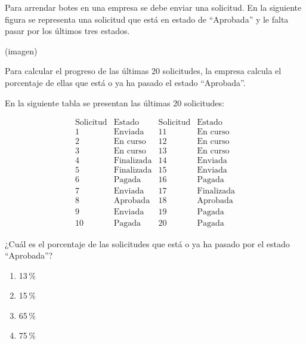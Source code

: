 \begin{problem}
    Para arrendar botes en una empresa se debe enviar una solicitud. En la siguiente figura se representa una solicitud que está en estado de “Aprobada” y le falta pasar por los últimos tres estados.

    \begin{center}
    (imagen)
    \end{center}

    Para calcular el progreso de las últimas 20 solicitudes, la empresa calcula el porcentaje de ellas que está o ya ha pasado el estado “Aprobada”.

    En la siguiente tabla se presentan las últimas 20 solicitudes:

    \[
    \begin{array}{c|c|c|c}
    \text{Solicitud} & \text{Estado} & \text{Solicitud} & \text{Estado} \\
    \hline
    1 & \text{Enviada} & 11 & \text{En curso} \\
    2 & \text{En curso} & 12 & \text{En curso} \\
    3 & \text{En curso} & 13 & \text{En curso} \\
    4 & \text{Finalizada} & 14 & \text{Enviada} \\
    5 & \text{Finalizada} & 15 & \text{Enviada} \\
    6 & \text{Pagada} & 16 & \text{Pagada} \\
    7 & \text{Enviada} & 17 & \text{Finalizada} \\
    8 & \text{Aprobada} & 18 & \text{Aprobada} \\
    9 & \text{Enviada} & 19 & \text{Pagada} \\
    10 & \text{Pagada} & 20 & \text{Pagada}
    \end{array}
    \]

    ¿Cuál es el porcentaje de las solicitudes que está o ya ha pasado por el estado “Aprobada”?

    \begin{enumerate}[label=\Alph*.]
        \item 13\,\%
        \item 15\,\%
        \item 65\,\%
        \item 75\,\%
    \end{enumerate}
\end{problem}
